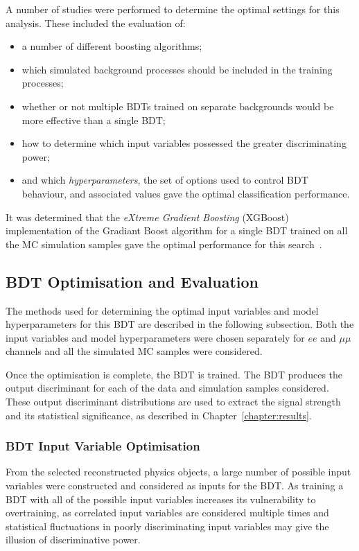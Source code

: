 A number of studies were performed to determine the optimal settings for this analysis.
These included the evaluation of:

\begin{itemize}
\item a number of different boosting algorithms;
\item which simulated background processes should be included in the training processes;
\item whether or not multiple BDTs trained on separate backgrounds would be more effective than a single BDT;
\item how to determine which input variables possessed the greater discriminating power;
\item and which \emph{hyperparameters}, the set of options used to control BDT behaviour, and associated values gave the optimal classification performance.
\end{itemize}

It was determined that the \emph{eXtreme Gradient Boosting} (XGBoost) implementation of the Gradiant Boost algorithm for a single BDT trained on all the MC simulation samples gave the optimal performance for this search~\cite{xgboost}.

\subsection{BDT Optimisation and Evaluation}\label{subsec:bdtOpt}
The methods used for determining the optimal input variables and model hyperparameters for this BDT are described in the following subsection.
Both the input variables and model hyperparameters were chosen separately for $ee$ and $\mu\mu$ channels and all the simulated MC samples were considered.

Once the optimisation is complete, the BDT is trained.
The BDT produces the output discriminant for each of the data and simulation samples considered.
These output discriminant distributions are used to extract the signal strength and its statistical significance, as described in Chapter~\ref{chapter:results}.

\subsubsection*{BDT Input Variable Optimisation}
From the selected reconstructed physics objects, a large number of possible input variables were constructed and considered as inputs for the BDT.
As training a BDT with all of the possible input variables increases its vulnerability to overtraining, as correlated input variables are considered multiple times and statistical fluctuations in poorly discriminating input variables may give the illusion of discriminative power.


